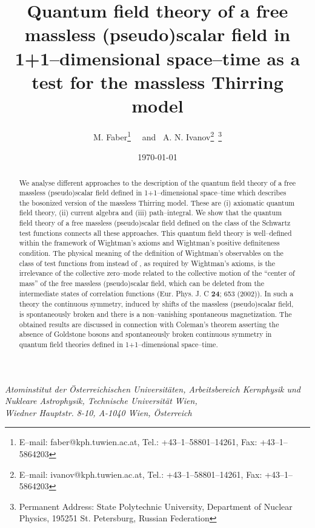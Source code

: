 \documentclass[a4paper,12pt] {article}
\begin{document}
\setcounter{page}{1}
\def\theequation{\arabic{section}.\arabic{equation}}
\def\theequation{\thesection.\arabic{equation}}
\setcounter{section}{0}

\title{Quantum field theory of a free massless (pseudo)scalar field in
1+1--dimensional space--time as a test for the massless Thirring model
}

\author{M. Faber\thanks{E--mail: faber@kph.tuwien.ac.at, Tel.:
+43--1--58801--14261, Fax: +43--1--5864203} ~~and~
A. N. Ivanov\thanks{E--mail: ivanov@kph.tuwien.ac.at, Tel.:
+43--1--58801--14261, Fax: +43--1--5864203}~\thanks{Permanent Address:
State Polytechnic University, Department of Nuclear Physics, 195251
St. Petersburg, Russian Federation}}

\date{\today}

\maketitle
\vspace{-0.5in}
\begin{center}
{\it Atominstitut der \"Osterreichischen Universit\"aten,
Arbeitsbereich Kernphysik und Nukleare Astrophysik, Technische
Universit\"at Wien, \\ Wiedner Hauptstr. 8-10, A-1040 Wien,
\"Osterreich }
\end{center}

\begin{center}
\begin{abstract}
We analyse different approaches to the description of the quantum
field theory of a free massless (pseudo)scalar field defined in
1+1--dimensional space--time which describes the bosonized version of
the massless Thirring model. These are (i) axiomatic quantum field
theory, (ii) current algebra and (iii) path--integral. We show that
the quantum field theory of a free massless (pseudo)scalar field
defined on the class of the Schwartz test functions \coordHE{} connects all these approaches. This quantum
field theory is well--defined within the framework of Wightman's
axioms and Wightman's positive definiteness condition. The physical
meaning of the definition of Wightman's observables on the class of
test functions from \coordHE{} instead of \coordHE{}, as required by Wightman's axioms, is the
irrelevance of the collective zero--mode related to the collective
motion of the ``center of mass'' of the free massless (pseudo)scalar
field, which can be deleted from the intermediate states of
correlation functions (Eur. Phys. J. C {\bf 24}; 653 (2002)).  In such
a theory the continuous symmetry, induced by shifts of the massless
(pseudo)scalar field, is spontaneously broken and there is a
non--vanishing spontaneous magnetization. The obtained results are
discussed in connection with Coleman's theorem asserting the absence
of Goldstone bosons and spontaneously broken continuous symmetry in
quantum field theories defined in 1+1--dimensional space--time.
\end{abstract}
\end{center}
\end{document}
